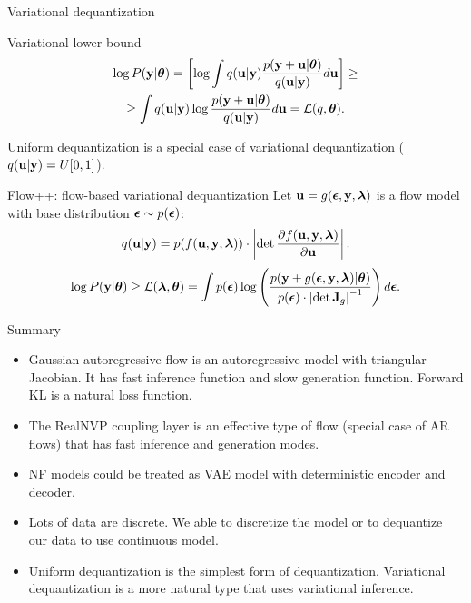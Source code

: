 \begin{frame}{Variational dequantization}
	\vspace{-0.2cm}
	\begin{block}{Variational lower bound}
		\vspace{-0.7cm}
		\begin{multline*}
			\log P(\mathbf{y} | \boldsymbol{\theta}) = \left[ \log \int q(\mathbf{u} | \mathbf{y}) \frac{p(\mathbf{y} + \mathbf{u} | \boldsymbol{\theta})}{q(\mathbf{u} | \mathbf{y})} d \mathbf{u} \right] \geq \\ 
			\geq  \int q(\mathbf{u} | \mathbf{y}) \log \frac{p(\mathbf{y} + \mathbf{u} | \boldsymbol{\theta})}{q(\mathbf{u} | \mathbf{y})} d \mathbf{u} = \mathcal{L}(q, \boldsymbol{\theta}).
		\end{multline*}
		\vspace{-0.6cm}
	\end{block}
	Uniform dequantization is a special case of variational dequantization ($q(\mathbf{u} | \mathbf{y}) = U[0, 1]$).
	\begin{block}{Flow++: flow-based variational dequantization}
		Let $\mathbf{u} = g(\boldsymbol{\epsilon}, \mathbf{y}, \boldsymbol{\lambda})$ is a flow model with base distribution $\boldsymbol{\epsilon} \sim p(\boldsymbol{\epsilon})$:
		\vspace{-0.3cm}
		\[
		q(\mathbf{u} | \mathbf{y}) = p(f(\mathbf{u}, \mathbf{y}, \boldsymbol{\lambda})) \cdot \left| \det \frac{\partial f(\mathbf{u}, \mathbf{y}, \boldsymbol{\lambda})}{\partial \mathbf{u}}\right|.
		\]
		\vspace{-0.3cm}
		\[
		\log P(\mathbf{y} | \boldsymbol{\theta}) \geq \mathcal{L}(\boldsymbol{\lambda}, \boldsymbol{\theta}) = \int p(\boldsymbol{\epsilon}) \log \left( \frac{p(\mathbf{y} + g(\boldsymbol{\epsilon}, \mathbf{y}, \boldsymbol{\lambda}) | \boldsymbol{\theta})}{p(\boldsymbol{\epsilon}) \cdot \left| \det \mathbf{J}_g\right|^{-1}} \right) d\boldsymbol{\epsilon}.
		\]
		\vspace{-0.3cm}
	\end{block}
\end{frame}
\begin{frame}{Summary}
	\begin{itemize}
		\item Gaussian autoregressive flow is an autoregressive model with triangular Jacobian. It has fast inference function and slow generation function. Forward KL is a natural loss function.
		\vfill
		\item The RealNVP coupling layer is an effective type of flow (special case of AR flows) that has fast inference and generation modes.
		\vfill
		\item NF models could be treated as VAE model with deterministic encoder and decoder.
		\vfill
		\item Lots of data are discrete. We able to discretize the model or to dequantize our data to use continuous model.
		\vfill
		\item Uniform dequantization is the simplest form of dequantization. Variational dequantization is a more natural type that uses variational inference.
	\end{itemize}
\end{frame}
 